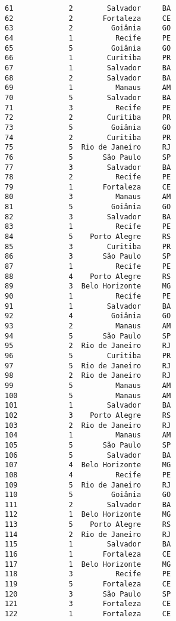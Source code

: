 \documentclass[11pt]{article}
\begin{document}
\begin{Verbatim}[commandchars=\\\{\}]
61             2        Salvador     BA  
62             2       Fortaleza     CE  
63             2         Goiânia     GO  
64             1          Recife     PE  
65             5         Goiânia     GO  
66             1        Curitiba     PR  
67             1        Salvador     BA  
68             2        Salvador     BA  
69             1          Manaus     AM  
70             5        Salvador     BA  
71             3          Recife     PE  
72             2        Curitiba     PR  
73             5         Goiânia     GO  
74             2        Curitiba     PR  
75             5  Rio de Janeiro     RJ  
76             5       São Paulo     SP  
77             3        Salvador     BA  
78             2          Recife     PE  
79             1       Fortaleza     CE  
80             3          Manaus     AM  
81             5         Goiânia     GO  
82             3        Salvador     BA  
83             1          Recife     PE  
84             5    Porto Alegre     RS  
85             3        Curitiba     PR  
86             3       São Paulo     SP  
87             1          Recife     PE  
88             4    Porto Alegre     RS  
89             3  Belo Horizonte     MG  
90             1          Recife     PE  
91             1        Salvador     BA  
92             4         Goiânia     GO  
93             2          Manaus     AM  
94             5       São Paulo     SP  
95             2  Rio de Janeiro     RJ  
96             5        Curitiba     PR  
97             5  Rio de Janeiro     RJ  
98             2  Rio de Janeiro     RJ  
99             5          Manaus     AM  
100            5          Manaus     AM  
101            1        Salvador     BA  
102            3    Porto Alegre     RS  
103            2  Rio de Janeiro     RJ  
104            1          Manaus     AM  
105            5       São Paulo     SP  
106            5        Salvador     BA  
107            4  Belo Horizonte     MG  
108            4          Recife     PE  
109            5  Rio de Janeiro     RJ  
110            5         Goiânia     GO  
111            2        Salvador     BA  
112            1  Belo Horizonte     MG  
113            5    Porto Alegre     RS  
114            2  Rio de Janeiro     RJ  
115            1        Salvador     BA  
116            1       Fortaleza     CE  
117            1  Belo Horizonte     MG  
118            3          Recife     PE  
119            5       Fortaleza     CE  
120            3       São Paulo     SP  
121            3       Fortaleza     CE  
122            1       Fortaleza     CE  

\end{Verbatim}
\end{document}
